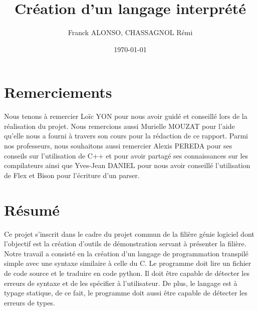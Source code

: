 \documentclass[a4paper]{article}%
\title{Création d'un langage interprété}
\author{Franck ALONSO, CHASSAGNOL Rémi}
\date{\today}
\begin{document}

\clearpage{}

\thispagestyle{empty}
\tableofcontents
\clearpage{}

\section*{Remerciements}
\thispagestyle{empty}

\doublespacing
\large %

Nous tenons à remercier Loïc YON pour nous avoir guidé et conseillé lors de la
réalisation du projet. Nous remercions aussi Murielle MOUZAT pour l'aide qu'elle
nous a fourni à travers son cours pour la rédaction de ce rapport. Parmi nos
professeurs, nous souhaitons aussi remercier Alexis PEREDA pour ses conseils sur
l'utilisation de C++ et pour avoir partagé ses connaissances sur les
compilateurs ainsi que Yves-Jean DANIEL pour nous avoir conseillé l'utilisation
de Flex et Bison pour l'écriture d'un \gls{parser}.

\normalsize
\onehalfspacing

\clearpage{}

\listoffigures
\clearpage{}


\section*{Résumé}

Ce projet s'inscrit dans le cadre du projet commun de la filière génie logiciel
dont l'objectif est la création d'outils de démonstration servant à présenter la
filière. Notre travail a consisté en la création d'un langage de programmation
transpilé simple avec une syntaxe similaire à celle du C. Le programme doit lire
un fichier de code source et le traduire en code python. Il doit être capable
de détecter les erreurs de syntaxe et de les spécifier à l'utilisateur. De
plus, le langage est à typage statique, de ce fait, le programme doit aussi être
capable de détecter les erreurs de types.\\
\end{document}
